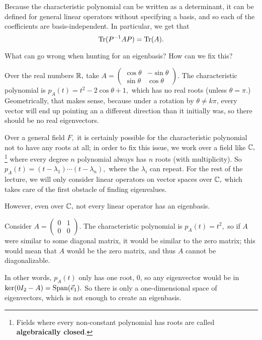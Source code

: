 

Because the characteristic polynomial can be written as a determinant, it can be defined for general linear operators without specifying a basis, and so each of the coefficients are basis-independent. In particular, we get that 
\[
\operatorname{Tr}(P^{-1}AP) = \operatorname{Tr}(A).
\]

\begin{qq}
What can go wrong when hunting for an eigenbasis? How can we fix this?
\end{qq}

\begin{example}
Over the real numbers $\mathbb R,$ take $A = \begin{pmatrix}
\cos\theta & -\sin\theta \\
\sin\theta & \cos\theta
\end{pmatrix}$. The characteristic polynomial is $p_A(t) = t^2 - 2\cos\theta + 1,$ which has no real roots (unless $\theta = \pi$.) Geometrically, that makes sense, because under a rotation by $\theta \neq k\pi$, every vector will end up pointing an a different direction than it initially was, so there should be no real eigenvectors.
\end{example}

Over a general field $F,$ it is certainly possible for the characteristic polynomial not to have any roots at all; in order to fix this issue, we work over a field like $\mathbb C,$\footnote{Fields where every non-constant polynomial has roots are called \textbf{algebraically closed}.} where every degree $n$ polynomial always has $n$ roots (with multiplicity). So $p_A(t) = (t - \lambda_1) \cdots (t - \lambda_n),$ where the $\lambda_i$ can repeat. For the rest of the lecture, we will only consider linear operators on vector spaces over $\mathbb C,$ which takes care of the first obstacle of finding eigenvalues.

However, even over $\mathbb C,$ not every linear operator has an eigenbasis. 
\begin{example}
Consider $A = \begin{pmatrix}
0 & 1 \\ 0 & 0
\end{pmatrix}$. The characteristic polynomial is $p_A(t) = t^2,$ so if $A$ were similar to some diagonal matrix, it would be similar to the zero matrix; this would mean that $A$ would be the zero matrix, and thus $A$ cannot be diagonalizable. 

In other words, $p_A(t)$ only has one root, 0, so any eigenvector would be in $\ker(0 I_2 - A) = \text{Span}(\vec{e}_1).$ So there is only a one-dimensional space of eigenvectors, which is not enough to create an eigenbasis. 
\end{example}

